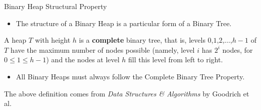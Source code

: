 \documentclass[10pt,compress]{beamer}
\begin{document}
\begin{frame}{Binary Heap Structural Property}
  \begin{itemize}
    \item The structure of a Binary Heap is a particular form of a Binary Tree.
  \end{itemize}
  \begin{complete_binary_tree_property}
    A heap $T$ with height $h$ is a \textbf{complete} binary tree, that is, levels $0$,$1$,$2$,$\ldots$,$h-1$ of $T$ have the maximum number of nodes possible (namely, level $i$ has $2^i$ nodes, for \(0\leq 1\leq h-1\)) and the nodes at level $h$ fill this level from left to right.
  \end{complete_binary_tree_property}
  \begin{itemize}
    \item All Binary Heaps must always follow the Complete Binary Tree Property.
  \end{itemize}

  The above definition comes from \textit{Data Structures \& Algorithms} by Goodrich et al.
\end{frame}
\end{document}
